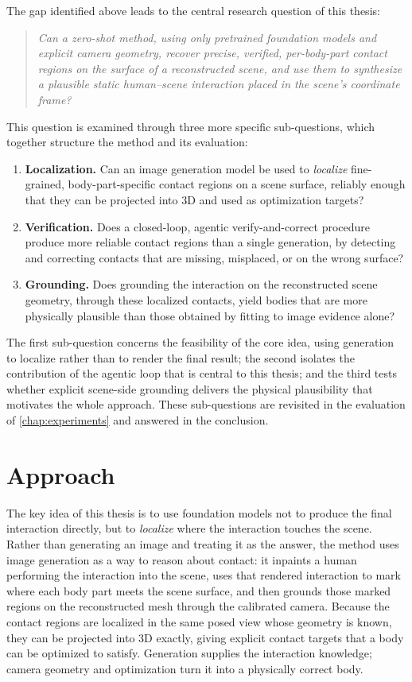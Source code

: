 The gap identified above leads to the central research question of this thesis:

\begin{quote}
\emph{Can a zero-shot method, using only pretrained foundation models and explicit camera geometry, recover precise, verified, per-body-part contact regions on the surface of a reconstructed scene, and use them to synthesize a plausible static human--scene interaction placed in the scene's coordinate frame?}
\end{quote}

This question is examined through three more specific sub-questions, which together structure the method and its evaluation:

\begin{enumerate}
  \item \textbf{Localization.} Can an image generation model be used to \emph{localize} fine-grained, body-part-specific contact regions on a scene surface, reliably enough that they can be projected into 3D and used as optimization targets?
  \item \textbf{Verification.} Does a closed-loop, agentic verify-and-correct procedure produce more reliable contact regions than a single generation, by detecting and correcting contacts that are missing, misplaced, or on the wrong surface?
  \item \textbf{Grounding.} Does grounding the interaction on the reconstructed scene geometry, through these localized contacts, yield bodies that are more physically plausible than those obtained by fitting to image evidence alone?
\end{enumerate}

The first sub-question concerns the feasibility of the core idea, using generation to localize rather than to render the final result; the second isolates the contribution of the agentic loop that is central to this thesis; and the third tests whether explicit scene-side grounding delivers the physical plausibility that motivates the whole approach. These sub-questions are revisited in the evaluation of \cref{chap:experiments} and answered in the conclusion.

\section{Approach}
\label{sec:intro-approach}

The key idea of this thesis is to use foundation models not to produce the final interaction directly, but to \emph{localize} where the interaction touches the scene. Rather than generating an image and treating it as the answer, the method uses image generation as a way to reason about contact: it inpaints a human performing the interaction into the scene, uses that rendered interaction to mark where each body part meets the scene surface, and then grounds those marked regions on the reconstructed mesh through the calibrated camera. Because the contact regions are localized in the same posed view whose geometry is known, they can be projected into 3D exactly, giving explicit contact targets that a body can be optimized to satisfy. Generation supplies the interaction knowledge; camera geometry and optimization turn it into a physically correct body.

